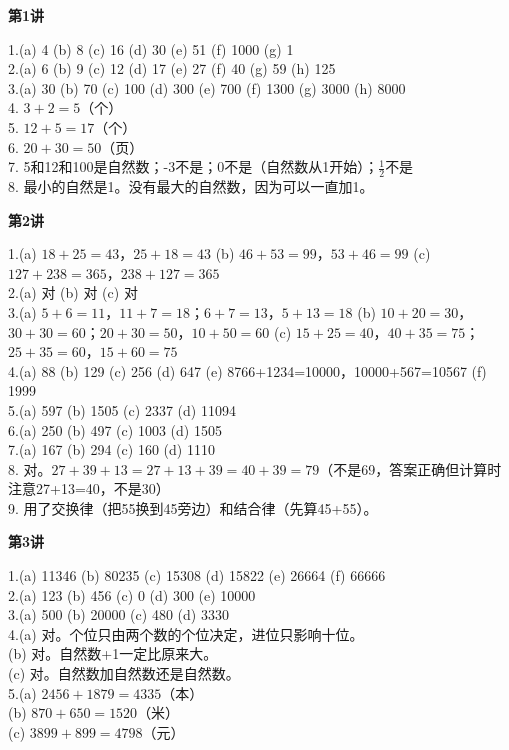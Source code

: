 

\textbf{第1讲}

1.(a) 4 \quad (b) 8 \quad (c) 16 \quad (d) 30 \quad (e) 51 \quad (f) 1000 \quad (g) 1\\
2.(a) 6 \quad (b) 9 \quad (c) 12 \quad (d) 17 \quad (e) 27 \quad (f) 40 \quad (g) 59 \quad (h) 125\\
3.(a) 30 \quad (b) 70 \quad (c) 100 \quad (d) 300 \quad (e) 700 \quad (f) 1300 \quad (g) 3000 \quad (h) 8000\\
4. $3+2=5$（个）\\
5. $12+5=17$（个）\\
6. $20+30=50$（页）\\
7. 5和12和100是自然数；-3不是；0不是（自然数从1开始）；$\frac12$不是\\
8. 最小的自然是1。没有最大的自然数，因为可以一直加1。

\textbf{第2讲}

1.(a) $18+25=43$，$25+18=43$ \quad (b) $46+53=99$，$53+46=99$ \quad (c) $127+238=365$，$238+127=365$\\
2.(a) 对 \quad (b) 对 \quad (c) 对\\
3.(a) $5+6=11$，$11+7=18$；$6+7=13$，$5+13=18$ \quad (b) $10+20=30$，$30+30=60$；$20+30=50$，$10+50=60$ \quad (c) $15+25=40$，$40+35=75$；$25+35=60$，$15+60=75$\\
4.(a) 88 \quad (b) 129 \quad (c) 256 \quad (d) 647 \quad (e) 8766+1234=10000，10000+567=10567 \quad (f) 1999\\
5.(a) 597 \quad (b) 1505 \quad (c) 2337 \quad (d) 11094\\
6.(a) 250 \quad (b) 497 \quad (c) 1003 \quad (d) 1505\\
7.(a) 167 \quad (b) 294 \quad (c) 160 \quad (d) 1110\\
8. 对。$27+39+13 = 27+13+39 = 40+39 = 79$（不是69，答案正确但计算时注意27+13=40，不是30）\\
9. 用了交换律（把55换到45旁边）和结合律（先算45+55）。

\textbf{第3讲}

1.(a) 11346 \quad (b) 80235 \quad (c) 15308 \quad (d) 15822 \quad (e) 26664 \quad (f) 66666\\
2.(a) 123 \quad (b) 456 \quad (c) 0 \quad (d) 300 \quad (e) 10000\\
3.(a) 500 \quad (b) 20000 \quad (c) 480 \quad (d) 3330\\
4.(a) 对。个位只由两个数的个位决定，进位只影响十位。\\
(b) 对。自然数+1一定比原来大。\\
(c) 对。自然数加自然数还是自然数。\\
5.(a) $2456+1879=4335$（本）\\
(b) $870+650=1520$（米）\\
(c) $3899+899=4798$（元）

